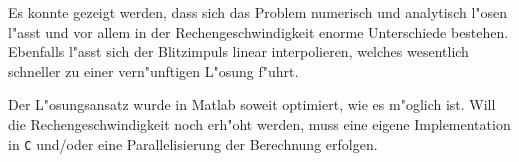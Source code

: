 \begin{refsection}
Es konnte gezeigt werden, dass sich das Problem numerisch und analytisch l"osen l"asst und vor allem in der Rechengeschwindigkeit enorme Unterschiede bestehen. Ebenfalls l"asst sich der Blitzimpuls linear interpolieren, welches wesentlich schneller zu einer vern"unftigen L"osung f"uhrt.

Der L"osungsansatz wurde in Matlab soweit optimiert, wie es m"oglich ist. Will die Rechengeschwindigkeit noch erh"oht werden, muss eine eigene Implementation in \texttt{C} und/oder eine Parallelisierung der Berechnung erfolgen.

\printbibliography[heading=subbibliography]
\end{refsection}
